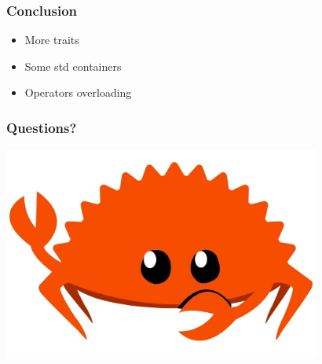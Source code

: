 \documentclass[aspectratio=1610,t]{beamer}
\begin{document}

\begin{frame}[fragile]
\frametitle{Conclusion}
\begin{itemize}
    \item More traits
    \item Some std containers
    \item Operators overloading
\end{itemize}
\end{frame}


\begin{frame}
\frametitle{Questions?}
\begin{center}
\includegraphics[width=\textwidth,height=7cm,keepaspectratio]{images/crab.jpg}
\end{center}
\end{frame}

\end{document}
